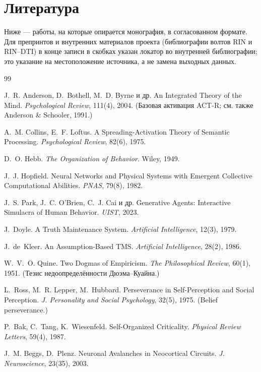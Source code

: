\chapter{Литература}
\label{ch:references}

Ниже — работы, на которые опирается монография, в согласованном формате. Для
препринтов и внутренних материалов проекта (библиографии волтов RIN и RIN–DTI) в
конце записи в скобках указан локатор во внутренней библиографии; это указание на
местоположение источника, а не замена выходных данных.

\begin{thebibliography}{99}
\small

 J.~R. Anderson, D.~Bothell, M.~D. Byrne и др.
An Integrated Theory of the Mind. \emph{Psychological Review}, 111(4), 2004.
(Базовая активация ACT-R; см. также Anderson \& Schooler, 1991.)

 A.~M. Collins, E.~F. Loftus.
A Spreading-Activation Theory of Semantic Processing.
\emph{Psychological Review}, 82(6), 1975.

 D.~O. Hebb. \emph{The Organization of Behavior}. Wiley, 1949.

 J.~J. Hopfield.
Neural Networks and Physical Systems with Emergent Collective Computational
Abilities. \emph{PNAS}, 79(8), 1982.

 J.~S. Park, J.~C. O'Brien, C.~J. Cai и др.
Generative Agents: Interactive Simulacra of Human Behavior. \emph{UIST}, 2023.

 J.~Doyle. A Truth Maintenance System.
\emph{Artificial Intelligence}, 12(3), 1979.

 J.~de~Kleer. An Assumption-Based TMS.
\emph{Artificial Intelligence}, 28(2), 1986.

 W.~V.~O. Quine. Two Dogmas of Empiricism.
\emph{The Philosophical Review}, 60(1), 1951. (Тезис недоопределённости
Дюэма–Куайна.)

 L.~Ross, M.~R. Lepper, M.~Hubbard.
Perseverance in Self-Perception and Social Perception.
\emph{J. Personality and Social Psychology}, 32(5), 1975. (Belief perseverance.)

 P.~Bak, C.~Tang, K.~Wiesenfeld.
Self-Organized Criticality. \emph{Physical Review Letters}, 59(4), 1987.

 J.~M. Beggs, D.~Plenz.
Neuronal Avalanches in Neocortical Circuits. \emph{J. Neuroscience}, 23(35), 2003.


\end{thebibliography}
